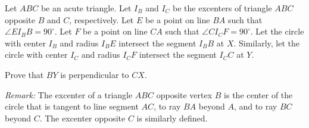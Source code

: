 Let $ABC$ be an acute triangle.
Let $I_B$ and $I_C$ be the excenters of triangle $ABC$ opposite $B$ and $C$, respectively.
Let $E$ be a point on line $BA$ such that $\angle EI_BB=90^\circ$.
Let $F$ be a point on line $CA$ such that $\angle CI_C F=90^\circ$.
Let the circle with center $I_B$ and radius $I_BE$ intersect the segment $I_BB$ at $X$.
Similarly, let the circle with center $I_C$ and radius $I_CF$ intersect the segment $I_CC$ at $Y$.

Prove that $BY$ is perpendicular to $CX$.

\emph{Remark:} The excenter of a triangle $ABC$ opposite vertex $B$ is the center of the
circle that is tangent to line segment $AC$, to ray $BA$ beyond $A$, and to ray $BC$ beyond $C$.
The excenter opposite $C$ is similarly defined.

